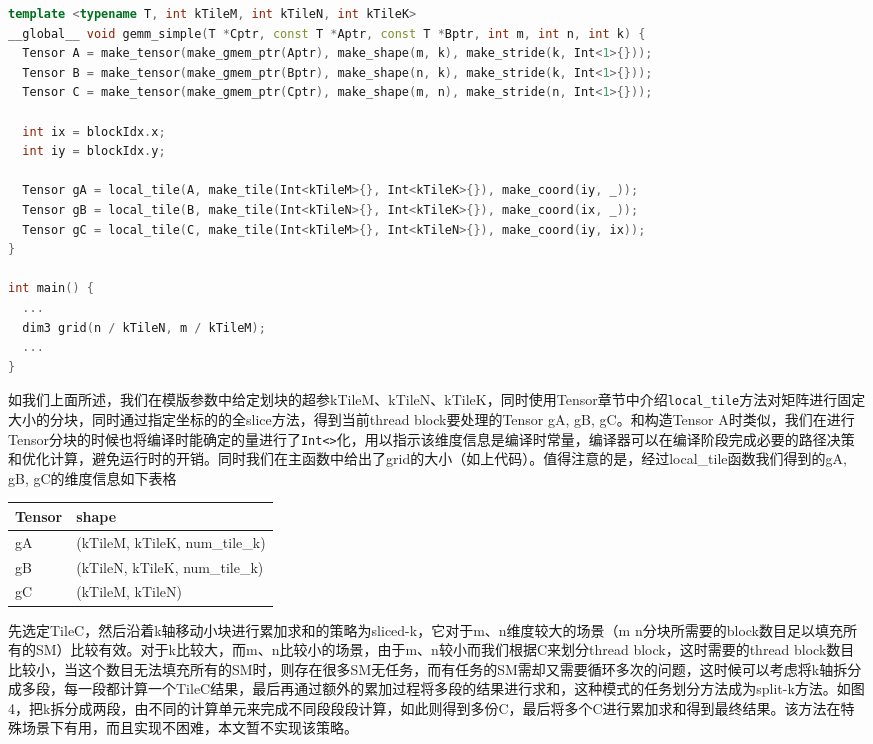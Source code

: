 \begin{lstlisting}[language=C++]
template <typename T, int kTileM, int kTileN, int kTileK>
__global__ void gemm_simple(T *Cptr, const T *Aptr, const T *Bptr, int m, int n, int k) {
  Tensor A = make_tensor(make_gmem_ptr(Aptr), make_shape(m, k), make_stride(k, Int<1>{}));
  Tensor B = make_tensor(make_gmem_ptr(Bptr), make_shape(n, k), make_stride(k, Int<1>{}));
  Tensor C = make_tensor(make_gmem_ptr(Cptr), make_shape(m, n), make_stride(n, Int<1>{}));

  int ix = blockIdx.x;
  int iy = blockIdx.y;

  Tensor gA = local_tile(A, make_tile(Int<kTileM>{}, Int<kTileK>{}), make_coord(iy, _));
  Tensor gB = local_tile(B, make_tile(Int<kTileN>{}, Int<kTileK>{}), make_coord(ix, _));
  Tensor gC = local_tile(C, make_tile(Int<kTileM>{}, Int<kTileN>{}), make_coord(iy, ix));
}

int main() {
  ...
  dim3 grid(n / kTileN, m / kTileM);
  ...
}
\end{lstlisting}

如我们上面所述，我们在模版参数中给定划块的超参kTileM、kTileN、kTileK，同时使用Tensor章节中介绍\lstinline|local_tile|方法对矩阵进行固定大小的分块，同时通过指定坐标的的全slice方法，得到当前thread block要处理的Tensor gA, gB, gC。和构造Tensor A时类似，我们在进行Tensor分块的时候也将编译时能确定的量进行了\lstinline|Int<>|化，用以指示该维度信息是编译时常量，编译器可以在编译阶段完成必要的路径决策和优化计算，避免运行时的开销。同时我们在主函数中给出了grid的大小（如上代码）。值得注意的是，经过local\_tile函数我们得到的gA, gB, gC的维度信息如下表格

\begin{table}[htbp]
\centering
\begin{tabular}{ll}
\toprule
Tensor & shape \\
\midrule
gA & (kTileM, kTileK, num\_tile\_k) \\
gB & (kTileN, kTileK, num\_tile\_k) \\
gC & (kTileM, kTileN) \\
\bottomrule
\end{tabular}
\end{table}

先选定TileC，然后沿着k轴移动小块进行累加求和的策略为sliced-k，它对于m、n维度较大的场景（m n分块所需要的block数目足以填充所有的SM）比较有效。对于k比较大，而m、n比较小的场景，由于m、n较小而我们根据C来划分thread block，这时需要的thread block数目比较小，当这个数目无法填充所有的SM时，则存在很多SM无任务，而有任务的SM需却又需要循环多次的问题，这时候可以考虑将k轴拆分成多段，每一段都计算一个TileC结果，最后再通过额外的累加过程将多段的结果进行求和，这种模式的任务划分方法成为split-k方法。如图4，把k拆分成两段，由不同的计算单元来完成不同段段段计算，如此则得到多份C，最后将多个C进行累加求和得到最终结果。该方法在特殊场景下有用，而且实现不困难，本文暂不实现该策略。

